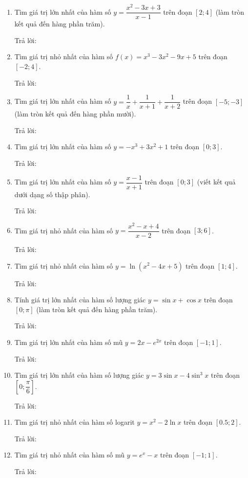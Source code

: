 \documentclass[12pt]{article}
\newcommand{\otraloi}{\underline{\hspace{5cm}}}
\begin{document}
\begin{enumerate}[label=\textbf{Câu \arabic*.}]
		\item Tìm giá trị lớn nhất của hàm số $y = \dfrac{x^2 - 3x + 3}{x - 1}$ trên đoạn $[2; 4]$ (làm tròn kết quả đến hàng phần trăm).
		\par Trả lời: \otraloi
		
		\item Tìm giá trị nhỏ nhất của hàm số $f(x) = x^3 - 3x^2 - 9x + 5$ trên đoạn $[-2; 4]$.
		\par Trả lời: \otraloi
		
		\item Tìm giá trị lớn nhất của hàm số $y = \dfrac{1}{x} + \dfrac{1}{x + 1} + \dfrac{1}{x + 2}$ trên đoạn $[-5; -3]$ (làm tròn kết quả đến hàng phần mười).
		\par Trả lời: \otraloi
		
		\item Tìm giá trị lớn nhất của hàm số $y = -x^3 + 3x^2 + 1$ trên đoạn $[0; 3]$.
		\par Trả lời: \otraloi
		
		\item Tìm giá trị lớn nhất của hàm số $y = \dfrac{x - 1}{x + 1}$ trên đoạn $[0; 3]$ (viết kết quả dưới dạng số thập phân).
		\par Trả lời: \otraloi
		
		\item Tìm giá trị nhỏ nhất của hàm số $y = \dfrac{x^2 - x + 4}{x - 2}$ trên đoạn $[3; 6]$.
		\par Trả lời: \otraloi
		
		\item Tìm giá trị nhỏ nhất của hàm số $y = \ln(x^2 - 4x + 5)$ trên đoạn $[1; 4]$.
		\par Trả lời: \otraloi
		
		\item Tính giá trị lớn nhất của hàm số lượng giác $y = \sin x + \cos x$ trên đoạn $[0; \pi]$ (làm tròn kết quả đến hàng phần trăm).
		\par Trả lời: \otraloi
		
		\item Tìm giá trị lớn nhất của hàm số mũ $y = 2x - e^{2x}$ trên đoạn $[-1; 1]$.
		\par Trả lời: \otraloi
		
		\item Tìm giá trị lớn nhất của hàm số lượng giác $y = 3\sin x - 4\sin^3 x$ trên đoạn $\left[0; \dfrac{\pi}{6}\right]$.
		\par Trả lời: \otraloi
		
		\item Tìm giá trị nhỏ nhất của hàm số logarit $y = x^2 - 2\ln x$ trên đoạn $[0.5; 2]$.
		\par Trả lời: \otraloi
		
		\item Tìm giá trị nhỏ nhất của hàm số mũ $y = e^x - x$ trên đoạn $[-1; 1]$.
		\par Trả lời: \otraloi
		
	\end{enumerate}
	
\end{document}
